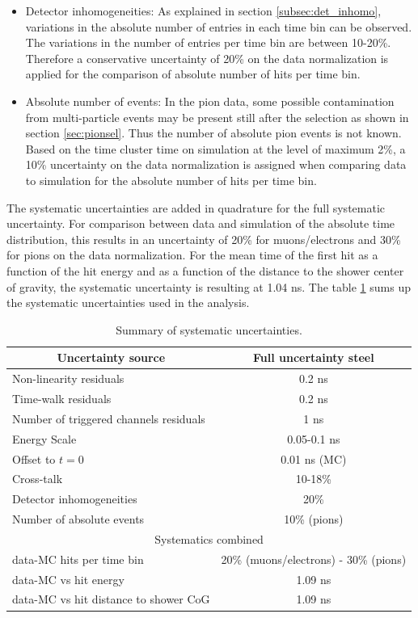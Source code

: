\begin{itemize}
	\item Detector inhomogeneities: As explained in section \ref{subsec:det_inhomo}, variations in the absolute number of entries in each time bin can be observed. The variations in the number of entries per time bin are between 10-20\%. Therefore a conservative uncertainty of 20\% on the data normalization is applied for the comparison of absolute number of hits per time bin.
	\item Absolute number of events: In the pion data, some possible contamination from multi-particle events may be present still after the selection as shown in section \ref{sec:pionsel}. Thus the number of absolute pion events is not known. Based on the time cluster time on simulation at the level of maximum 2\%, a 10\% uncertainty on the data normalization is assigned when comparing data to simulation for the absolute number of hits per time bin.
\end{itemize}

The systematic uncertainties are added in quadrature for the full systematic uncertainty. For comparison between data and simulation of the absolute time distribution, this results in an uncertainty of 20\% for muons/electrons and 30\% for pions on the data normalization. For the mean time of the first hit as a function of the hit energy and as a function of the distance to the shower center of gravity, the systematic uncertainty is resulting at 1.04 ns. The table \ref{table:time_syst} sums up the systematic uncertainties used in the analysis.
{
\renewcommand{\arraystretch}{1.2}
\begin{table}[htb!]
	\centering
	\caption{Summary of systematic uncertainties.}
	\label{table:time_syst}
	\begin{tabular}{@{} lc @{}}
		\toprule
		\multicolumn{1}{c}{Uncertainty source} & Full uncertainty steel \\
		\midrule
		Non-linearity residuals & 0.2 ns \\
		Time-walk residuals & 0.2 ns \\
		Number of triggered channels residuals & 1 ns \\
		Energy Scale & 0.05-0.1 ns \\
		Offset to $t=0$ & 0.01 ns (MC) \\
		Cross-talk & 10-18\% \\
		Detector inhomogeneities & 20\% \\
		Number of absolute events & 10\% (pions) \\
		\midrule
		\midrule
		\multicolumn{2}{c}{Systematics combined} \\
		\midrule
		data-MC hits per time bin & 20\% (muons/electrons) - 30\% (pions) \\
		data-MC vs hit energy & 1.09 ns \\
		data-MC vs hit distance to shower CoG & 1.09 ns \\
		\bottomrule
	\end{tabular}
\end{table}
}

